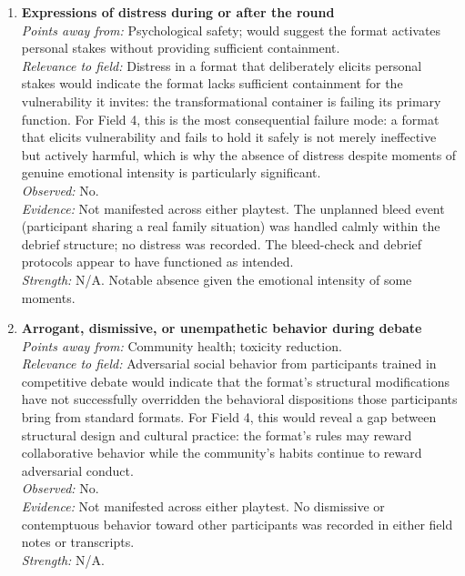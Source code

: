 \documentclass[12pt]{article}
\begin{document}
\begin{enumerate}

\item \textbf{Expressions of distress during or after the round}\\
\textit{Points away from:} Psychological safety; would suggest the format activates personal stakes without providing sufficient containment.\\
\textit{Relevance to field:} Distress in a format that deliberately elicits personal stakes would indicate the format lacks sufficient containment for the vulnerability it invites: the transformational container is failing its primary function. For Field 4, this is the most consequential failure mode: a format that elicits vulnerability and fails to hold it safely is not merely ineffective but actively harmful, which is why the absence of distress despite moments of genuine emotional intensity is particularly significant.\\
\textit{Observed:} No.\\
\textit{Evidence:} Not manifested across either playtest. The unplanned bleed event (participant sharing a real family situation) was handled calmly within the debrief structure; no distress was recorded. The bleed-check and debrief protocols appear to have functioned as intended.\\
\textit{Strength:} N/A. Notable absence given the emotional intensity of some moments.

\item \textbf{Arrogant, dismissive, or unempathetic behavior during debate}\\
\textit{Points away from:} Community health; toxicity reduction.\\
\textit{Relevance to field:} Adversarial social behavior from participants trained in competitive debate would indicate that the format's structural modifications have not successfully overridden the behavioral dispositions those participants bring from standard formats. For Field 4, this would reveal a gap between structural design and cultural practice: the format's rules may reward collaborative behavior while the community's habits continue to reward adversarial conduct.\\
\textit{Observed:} No.\\
\textit{Evidence:} Not manifested across either playtest. No dismissive or contemptuous behavior toward other participants was recorded in either field notes or transcripts.\\
\textit{Strength:} N/A.


\end{enumerate}
\end{document}
